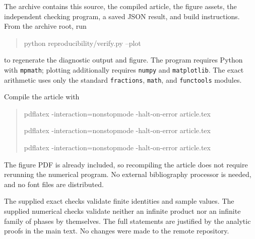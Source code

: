 \documentclass[11pt,a4paper]{article}
\numberwithin{equation}{section}
\theoremstyle{plain}
\theoremstyle{definition}
\theoremstyle{remark}
\newcommand{\code}[1]{\texttt{\small #1}}
\begin{document}
The archive contains this source, the compiled article, the figure assets,
the independent checking program, a saved JSON result, and build
instructions. From the archive root, run
\begin{quote}\ttfamily
python reproducibility/verify.py --plot
\end{quote}
to regenerate the diagnostic output and figure. The program requires
Python with \code{mpmath}; plotting additionally requires \code{numpy}
and \code{matplotlib}. The exact arithmetic uses only the standard
\code{fractions}, \code{math}, and \code{functools} modules.

Compile the article with
\begin{quote}\ttfamily
pdflatex -interaction=nonstopmode -halt-on-error article.tex\par
pdflatex -interaction=nonstopmode -halt-on-error article.tex\par
pdflatex -interaction=nonstopmode -halt-on-error article.tex
\end{quote}
The figure PDF is already included, so recompiling the article does not
require rerunning the numerical program. No external bibliography processor
is needed, and no font files are distributed.

The supplied exact checks validate finite identities and sample values.
The supplied numerical checks validate neither an infinite product nor an
infinite family of phases by themselves. The full statements are justified
by the analytic proofs in the main text. No changes were made to the
remote repository.
\end{document}
